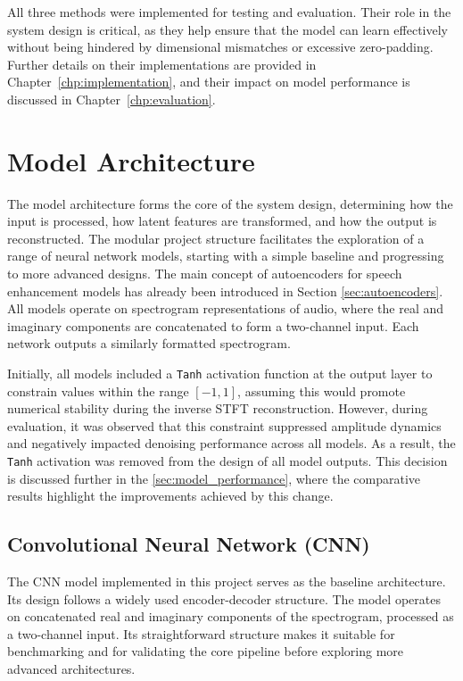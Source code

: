 All three methods were implemented for testing and evaluation. Their role in the system design is critical, as they help ensure that the model can learn effectively without being hindered by dimensional mismatches or excessive zero-padding. Further details on their implementations are provided in Chapter~\ref{chp:implementation}, and their impact on model performance is discussed in Chapter~\ref{chp:evaluation}.

\section{Model Architecture}
\label{sec:model_architecture}

The model architecture forms the core of the system design, determining how the input is processed, how latent features are transformed, and how the output is reconstructed. The modular project structure facilitates the exploration of a range of neural network models, starting with a simple baseline and progressing to more advanced designs. The main concept of autoencoders for speech enhancement models has already been introduced in Section \ref{sec:autoencoders}. All models operate on spectrogram representations of audio, where the real and imaginary components are concatenated to form a two-channel input. Each network outputs a similarly formatted spectrogram.

Initially, all models included a \texttt{Tanh} activation function at the output layer to constrain values within the range \([-1, 1]\), assuming this would promote numerical stability during the inverse STFT reconstruction. However, during evaluation, it was observed that this constraint suppressed amplitude dynamics and negatively impacted denoising performance across all models. As a result, the \texttt{Tanh} activation was removed from the design of all model outputs. This decision is discussed further in the \ref{sec:model_performance}, where the comparative results highlight the improvements achieved by this change.

\subsection{Convolutional Neural Network (CNN)}
\label{sec:cnn}

The CNN model implemented in this project serves as the baseline architecture. Its design follows a widely used encoder-decoder structure. The model operates on concatenated real and imaginary components of the spectrogram, processed as a two-channel input. Its straightforward structure makes it suitable for benchmarking and for validating the core pipeline before exploring more advanced architectures.

